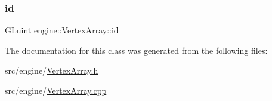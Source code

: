 \subsubsection{\texorpdfstring{id}{id}}
{\footnotesize\ttfamily G\+Luint engine\+::\+Vertex\+Array\+::id\hspace{0.3cm}{\ttfamily [private]}}



The documentation for this class was generated from the following files\+:\begin{DoxyCompactItemize}
\item 
src/engine/\mbox{\hyperlink{_vertex_array_8h}{Vertex\+Array.\+h}}\item 
src/engine/\mbox{\hyperlink{_vertex_array_8cpp}{Vertex\+Array.\+cpp}}\end{DoxyCompactItemize}

